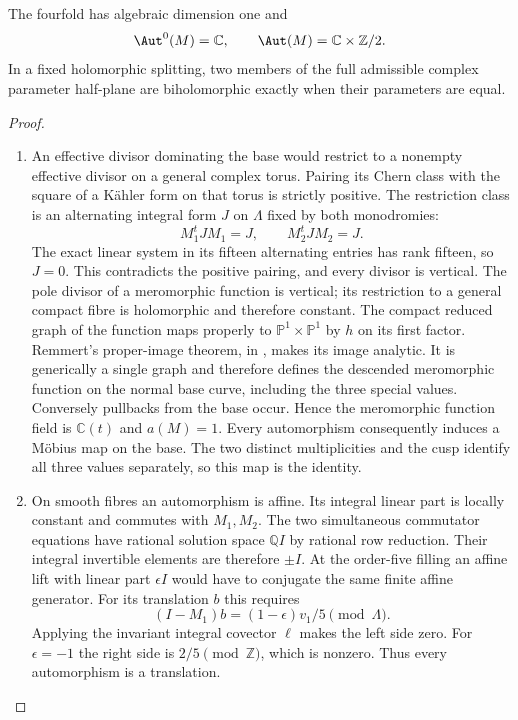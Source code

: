 \begin{theorem}\hypertarget{tag-02R4}{}\label{night:P1A.4}
The fourfold has algebraic dimension one and
\[
\Aut^0(M)=\mathbb C,\qquad
\Aut(M)=\mathbb C\times\mathbb Z/2.
\]
In a fixed holomorphic splitting, two members of the full
admissible complex parameter half-plane are biholomorphic
exactly when their parameters are equal.
\end{theorem}
\begin{proof}
\begin{enumerate}[label={$\langle1\rangle$\arabic*.}]
\item An effective divisor dominating the base would restrict to
a nonempty effective divisor on a general complex torus.
Pairing its Chern class with the square of a Kähler form
on that torus is strictly positive. The restriction class is an alternating integral form $J$ on $\Lambda$
fixed by both monodromies:
\[
M_1^tJM_1=J,\qquad M_2^tJM_2=J.
\]
The exact linear system in its fifteen alternating entries has rank
fifteen, so $J=0$.  This contradicts the positive pairing, and every
divisor is vertical.
The pole divisor of a meromorphic function is vertical;
its restriction to a general compact fibre is holomorphic
and therefore constant. The compact reduced graph of the function maps properly to
$\mathbb P^1\times\mathbb P^1$ by $h$ on its first factor.
Remmert's proper-image theorem, in
\cite[\S7, Satz~1, p.~60]{Grauert60}, makes its image analytic.
It is generically a single graph and therefore defines the descended
meromorphic function on the normal base curve, including the three
special values.
Conversely pullbacks from the base occur. Hence the
meromorphic function field is $\mathbb C(t)$ and $a(M)=1$.
Every automorphism consequently induces a Möbius map on
the base. The two distinct multiplicities and the cusp
identify all three values separately, so this map is the
identity.

\item On smooth fibres an automorphism is affine. Its integral
linear part is locally constant and commutes with $M_1,M_2$.
The two simultaneous commutator equations have rational solution
space $\mathbb QI$ by rational row reduction. Their integral invertible
elements are therefore $\pm I$. At the order-five filling an affine lift with
linear part $\epsilon I$ would have to conjugate the same
finite affine generator. For its translation $b$ this
requires
\[
(I-M_1)b=(1-\epsilon)v_1/5\pmod\Lambda.
\]
Applying the invariant integral covector $\ell$ makes the
left side zero. For $\epsilon=-1$ the right side is
$2/5\pmod\mathbb Z$, which is nonzero. Thus every
automorphism is a translation.


\end{enumerate}
\end{proof}
